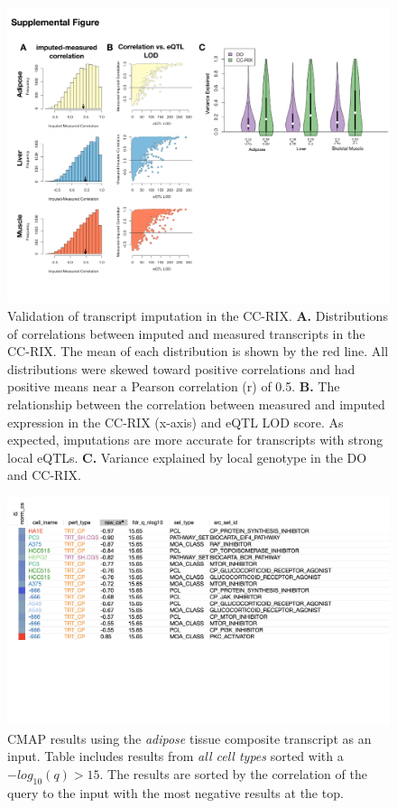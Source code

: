 \documentclass[
]{article}
\begin{document}
\begin{figure}[ht!]
\includegraphics[width=\textwidth]{Figures/Supp_Fig_CC-RIX_Imputation.pdf} 
\caption{Validation of transcript imputation in the CC-RIX. \textbf{A.} 
Distributions of correlations between imputed and measured transcripts 
in the CC-RIX. The mean of each distribution is shown by the red line. 
All distributions were skewed toward positive correlations and had
 positive means near a Pearson correlation (r) of 0.5. \textbf{B.} 
 The relationship between the correlation between measured and 
 imputed expression in the CC-RIX (x-axis) and eQTL LOD score. As 
 expected, imputations are more accurate for transcripts with strong 
 local eQTLs. \textbf{C.} Variance explained by local genotype in the 
 DO and CC-RIX. 
}
\label{fig:cc_imputation}
\end{figure}

\begin{figure}[ht!]
\includegraphics[width=\textwidth]{Figures/Supp_Fig_Adipose_all_cell_types.png} 
\caption{CMAP results using the \textit{adipose} tissue composite transcript as 
an input. Table includes results from \textit{all cell types} sorted with a 
$-log_{10}(q) > 15$. The results are sorted by the correlation of the 
query to the input with the most negative results at the top.
}
\label{fig:clue_adipose_all}
\end{figure}
\end{document}
